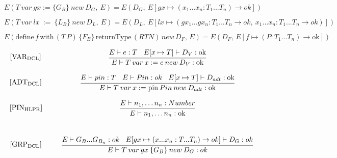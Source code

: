 \begin{equation}\label{app:typehelp3}
    E(T \: var \: gx := \{G_B\} \: new \: D_G, \: E) = E(D_G, \: E[gx \mapsto (x_1...x_n : T_1...T_n)\xrightarrow{}ok])
\end{equation}

\begin{equation}\label{app:typehelp4}
    E(T \ var \ lx \: := \: \{L_B\} \: new \: D_L, \: E) = E(D_L, \: E[lx \mapsto (gx_1...gx_n : T_1...T_n \xrightarrow{} ok, \: x_1...x_n : T_1...T_n \xrightarrow{} ok)])
\end{equation}

 \begin{equation} \label{app:typehelp5}
     E(\text{define} \, f \, \text{with} \, (T \, P) \, \{F_B\} \, \text{returnType} \, (RTN) \, new \, D_F, \, E) = E(D_F, \, E[f \mapsto (P:T_1...T_n) \xrightarrow{}\text{ok}])
 \end{equation}

\begin{equation}
\begin{minipage}{.2\linewidth}
$[\text{VAR}_\text{DCL}]$
\end{minipage}
\begin{minipage}{.8\linewidth}
\centering
$\cfrac{E \vdash e : T \: \: \: \: E[x \mapsto T] \vdash D_V : \text{ok}} {E \vdash T \: var \: x := e \: new \: D_V : \text{ok}}$
\end{minipage}
\end{equation}

\begin{equation}
\begin{minipage}{.2\linewidth}
$[\text{ADT}_\text{DCL}]$
\end{minipage}
\begin{minipage}{.8\linewidth}
\centering
$\cfrac{E \vdash pin : T \: \: \: \: E \vdash Pin : ok \: \:  \: \: E[x \mapsto T] \vdash D_{adt} : \text{ok}} {E \vdash T \: var \: x := \text{pin} \: Pin \: new \: D_{adt} : \text{ok}}$
\end{minipage}
\end{equation}

\begin{equation}
\begin{minipage}{.2\linewidth}
$[\text{PIN}_\text{HLPR}]$
\end{minipage}
\begin{minipage}{.8\linewidth}
\centering
$\cfrac{E \vdash n_1, \dots n_n : Number} {E \vdash n_1, \dots n_n : \text{ok}}$
\end{minipage}
\end{equation}
\\
\begin{equation}
\begin{minipage}{.2\linewidth}
$[\text{GRP}_\text{DCL}]$
\end{minipage}
\begin{minipage}{.8\linewidth}
\centering
$\cfrac{E \vdash G_B...G_{B_{n}} : ok \: \: \: \: E[gx \mapsto (x...x_n: T...T_n)\xrightarrow{}ok] \vdash D_G : ok}{E \vdash T \: var \: gx \: \{G_B\} \: new \: D_G : ok}$
\end{minipage}
\end{equation}

